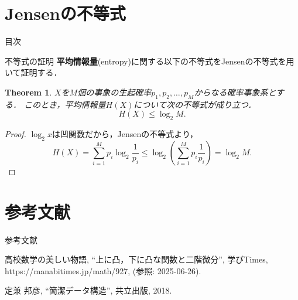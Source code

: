 \documentclass[dvipdfmx,aspectratio=169]{beamer}
\theoremstyle{plain}
\newtheorem{thm}{Theorem}
\theoremstyle{definition}
\begin{document}
\section{Jensenの不等式}
\begin{frame}{目次}
	\tableofcontents[currentsection]
\end{frame}


\begin{frame}{不等式の証明}
	\textbf{平均情報量}(entropy)に関する以下の不等式をJensenの不等式を用いて証明する．
	\begin{thm}
		$X$を$M$個の事象の生起確率$p_{1}, p_{2}, \ldots, p_{M}$からなる確率事象系とする．
		このとき，平均情報量$H(X)$について次の不等式が成り立つ．
		\[
			H(X) \le \log_2 M.
		\]
	\end{thm}

	\begin{proof}
		$\log_2 x$は凹関数だから，Jensenの不等式より，
		\[
			H(X) = \sum_{i=1}^M p_{i} \log_2 \frac{1}{p_{i}} \le \log_2 (\sum_{i=1}^M p_{i} \frac{1}{p_{i}}) = \log_2 M.
		\]
	\end{proof}
\end{frame}

\section*{参考文献}
\begin{frame}{参考文献}
	\begin{thebibliography}{9}
		\renewcommand{\baselinestretch}{1.0}
		\small
		\beamertemplatetextbibitems
		高校数学の美しい物語,
		``上に凸，下に凸な関数と二階微分'',
		学びTimes,
		https://manabitimes.jp/math/927,
		(参照: 2025-06-26).

		定兼 邦彦,
		``簡潔データ構造'',
		共立出版, 2018.

	\end{thebibliography}
\end{frame}
\end{document}
